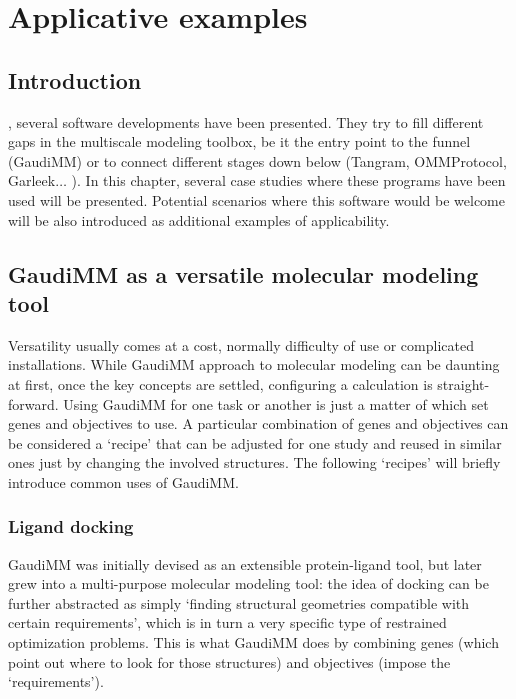 \chapter{Applicative examples}
\label{chap:06}

\section{Introduction}
, several software developments have been presented. They try to fill different gaps in the multiscale modeling toolbox, be it the entry point to the funnel (GaudiMM) or to connect different stages down below (Tangram, OMMProtocol, Garleek$ \ldots $ ). In this chapter, several case studies where these programs have been used will be presented. Potential scenarios where this software would be welcome will be also introduced as additional examples of applicability.

\section{GaudiMM as a versatile molecular modeling tool}
Versatility usually comes at a cost, normally difficulty of use or complicated installations. While GaudiMM approach to molecular modeling can be daunting at first, once the key concepts are settled, configuring a calculation is straight-forward. Using GaudiMM for one task or another is just a matter of which set genes and objectives to use. A particular combination of genes and objectives can be considered a ‘recipe’ that can be adjusted for one study and reused in similar ones just by changing the involved structures. The following ‘recipes’ will briefly introduce common uses of GaudiMM.

\subsection{Ligand docking}
GaudiMM was initially devised as an extensible protein-ligand tool, but later grew into a multi-purpose molecular modeling tool: the idea of docking can be further abstracted as simply ‘finding structural geometries compatible with certain requirements’, which is in turn a very specific type of restrained optimization problems. This is what GaudiMM does by combining genes (which point out where to look for those structures) and objectives (impose the ‘requirements’).

